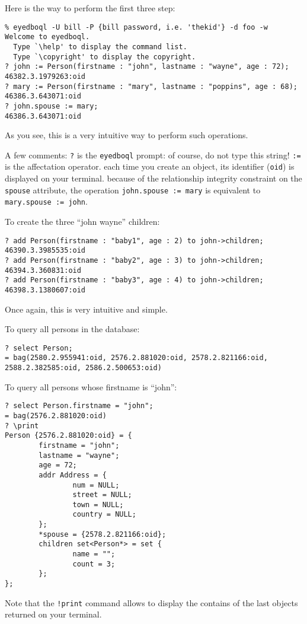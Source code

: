 Here is the way to perform the first three step:
\verbsize \begin{verbatim}
% eyedboql -U bill -P {bill password, i.e. 'thekid'} -d foo -w
Welcome to eyedboql.
  Type `\help' to display the command list.
  Type `\copyright' to display the copyright.
? john := Person(firstname : "john", lastname : "wayne", age : 72);
46382.3.1979263:oid
? mary := Person(firstname : "mary", lastname : "poppins", age : 68);
46386.3.643071:oid
? john.spouse := mary;
46386.3.643071:oid
\end{verbatim}
\normalsize
As you see, this is a very intuitive way to perform such operations.

A few comments:
\idt \texttt{?} is the \texttt{eyedboql} prompt: of course, do not type
this string!
\idt \texttt{:=} is the affectation operator.
\idt each time you create an object, its identifier (\texttt{oid}) is displayed
on your terminal.
\idt because of the relationship integrity constraint on the \texttt{spouse}
attribute, the operation \texttt{john.spouse := mary} is equivalent to
\texttt{mary.spouse := john}.

To create the three ``john wayne'' children:
\verbsize \begin{verbatim}
? add Person(firstname : "baby1", age : 2) to john->children;
46390.3.3985535:oid
? add Person(firstname : "baby2", age : 3) to john->children;
46394.3.360831:oid
? add Person(firstname : "baby3", age : 4) to john->children;
46398.3.1380607:oid
\end{verbatim}
\normalsize
Once again, this is very intuitive and simple.

To query all persons in the database:
\verbsize \begin{verbatim}
? select Person;
= bag(2580.2.955941:oid, 2576.2.881020:oid, 2578.2.821166:oid, 2588.2.382585:oid, 2586.2.500653:oid)
\end{verbatim}
\normalsize
To query all persons whose firstname is ``john'':
\verbsize \begin{verbatim}
? select Person.firstname = "john";
= bag(2576.2.881020:oid)
? \print
Person {2576.2.881020:oid} = { 
        firstname = "john";
        lastname = "wayne";
        age = 72;
        addr Address = { 
                num = NULL;
                street = NULL;
                town = NULL;
                country = NULL;
        };
        *spouse = {2578.2.821166:oid};
        children set<Person*> = set { 
                name = "";
                count = 3;
        };
};
\end{verbatim}
\normalsize
Note that the \texttt{!print} command allows to display the contains of the
last objects returned on your terminal.

